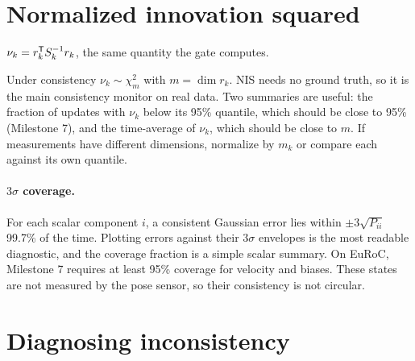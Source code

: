 \section{Normalized innovation squared}

\begin{definition}[NIS]
$\nu_k = r_k^{\mathsf{T}} S_k^{-1} r_k$, the same quantity the gate computes.
\end{definition}

Under consistency $\nu_k \sim \chi^2_m$ with $m = \dim r_k$. NIS needs no ground truth, so it is the main consistency
monitor on real data. Two summaries are useful: the fraction of updates with $\nu_k$ below its 95\% quantile, which
should be close to 95\% (Milestone 7), and the time-average of $\nu_k$, which should be close to $m$. If measurements have
different dimensions, normalize by $m_k$ or compare each against its own quantile.

\paragraph{$3\sigma$ coverage.} For each scalar component $i$, a consistent Gaussian error lies within $\pm3\sqrt{P_{ii}}$
99.7\% of the time. Plotting errors against their $3\sigma$ envelopes is the most readable diagnostic, and the coverage
fraction is a simple scalar summary. On EuRoC, Milestone 7 requires at least 95\% coverage for velocity and biases.
These states are not measured by the pose sensor, so their consistency is not circular.

\section{Diagnosing inconsistency}

